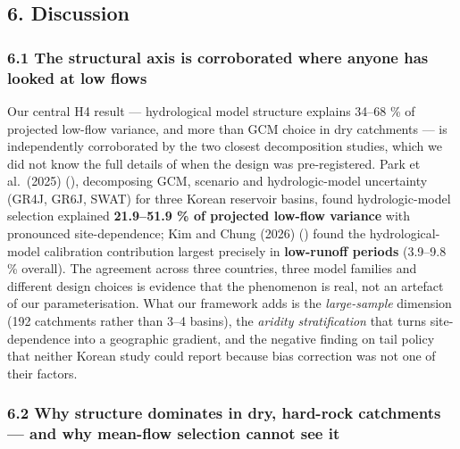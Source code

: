 \documentclass[
  english,
  11pt,
]{article}
\begin{document}
\subsection{6. Discussion}\label{discussion}

\subsubsection{6.1 The structural axis is corroborated where anyone has
looked at low
flows}\label{the-structural-axis-is-corroborated-where-anyone-has-looked-at-low-flows}

Our central H4 result --- hydrological model structure explains 34--68
\% of projected low-flow variance, and more than GCM choice in dry
catchments --- is independently corroborated by the two closest
decomposition studies, which we did not know the full details of when
the design was pre-registered. Park et al.~(2025)
(), decomposing GCM,
scenario and hydrologic-model uncertainty (GR4J, GR6J, SWAT) for three
Korean reservoir basins, found hydrologic-model selection explained
\textbf{21.9--51.9 \% of projected low-flow variance} with pronounced
site-dependence; Kim and Chung (2026)
() found the
hydrological-model calibration contribution largest precisely in
\textbf{low-runoff periods} (3.9--9.8 \% overall). The agreement across
three countries, three model families and different design choices is
evidence that the phenomenon is real, not an artefact of our
parameterisation. What our framework adds is the \emph{large-sample}
dimension (192 catchments rather than 3--4 basins), the \emph{aridity
stratification} that turns site-dependence into a geographic gradient,
and the negative finding on tail policy that neither Korean study could
report because bias correction was not one of their factors.

\subsubsection{6.2 Why structure dominates in dry, hard-rock catchments
--- and why mean-flow selection cannot see
it}\label{why-structure-dominates-in-dry-hard-rock-catchments-and-why-mean-flow-selection-cannot-see-it}
\end{document}
